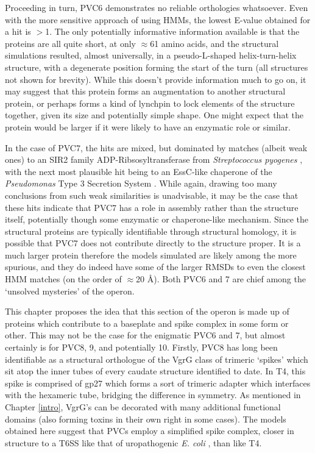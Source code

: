 Proceeding in turn, PVC6 demonstrates no reliable orthologies whatsoever. Even with the more sensitive approach of using HMMs, the lowest E-value obtained for a hit is $>$1. The only potentially informative information available is that the proteins are all quite short, at only $\approx$61 amino acids, and the structural simulations resulted, almost universally, in a pseudo-L-shaped helix-turn-helix structure, with a degenerate position forming the start of the turn (all structures not shown for brevity). While this doesn't provide information much to go on, it may suggest that this protein forms an augmentation to another structural protein, or perhaps forms a kind of lynchpin to lock elements of the structure together, given its size and potentially simple shape. One might expect that the protein would be larger if it were likely to have an enzymatic role or similar.


In the case of PVC7, the hits are mixed, but dominated by matches (albeit weak ones) to an SIR2 family ADP-Ribsosyltransferase from \emph{Streptococcus pyogenes} \citep{Shore2000}, with the next most plausible hit being to an EssC-like chaperone of the \emph{Pseudomonas} Type 3 Secretion System \citep{Vogelaar2010}. While again, drawing too many conclusions from such weak similarities is unadvisable, it may be the case that these hits indicate that PVC7 has a role in assembly rather than the structure itself, potentially though some enzymatic or chaperone-like mechanism. Since the structural proteins are typically identifiable through structural homology, it is possible that PVC7 does not contribute directly to the structure proper. It is a much larger protein therefore the models simulated are likely among the more spurious, and they do indeed have some of the larger RMSDs to even the closest HMM matches (on the order of $\approx$20 \AA). Both PVC6 and 7 are chief among the `unsolved mysteries' of the operon.

This chapter proposes the idea that this section of the operon is made up of proteins which contribute to a baseplate and spike complex in some form or other. This may not be the case for the enigmatic PVC6 and 7, but almost certainly is for PVC8, 9, and potentially 10. Firstly, PVC8 has long been identifiable as a structural orthologue of the VgrG class of trimeric `spikes' which sit atop the inner tubes of every caudate structure identified to date. In T4, this spike is comprised of gp27 which forms a sort of trimeric adapter which interfaces with the hexameric tube, bridging the difference in symmetry. As mentioned in Chapter \ref{intro}, VgrG's can be decorated with many additional functional domains (also forming toxins in their own right in some cases). The models obtained here suggest that PVCs employ a simplified spike complex, closer in structure to a T6SS like that of uropathogenic \emph{E. coli} \citep{Leiman2009}, than like T4.

